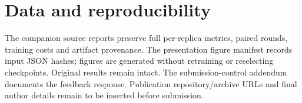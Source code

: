 \documentclass[conference]{IEEEtran}
\begin{document}
\section*{Data and reproducibility}

The companion source reports preserve full per-replica metrics, paired rounds, training costs and artifact provenance. The presentation figure manifest records input JSON hashes; figures are generated without retraining or reselecting checkpoints. Original results remain intact. The submission-control addendum documents the feedback response. Publication repository/archive URLs and final author details remain to be inserted before submission.

\label{bodyend}
\clearpage


\end{document}
